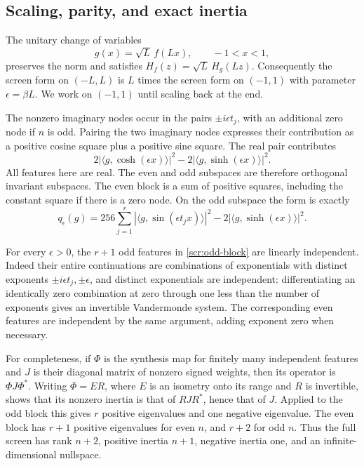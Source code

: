 \subsection{Scaling, parity, and exact inertia}

The unitary change of variables
\[
 g(x)=\sqrt L\,f(Lx),\qquad -1<x<1,
\]
preserves the norm and satisfies
\(H_f(z)=\sqrt L\,H_g(Lz)\). Consequently the screen form on
\((-L,L)\) is \(L\) times the screen form on \((-1,1)\) with
parameter \(\epsilon=\beta L\). We work on \((-1,1)\) until
scaling back at the end.

The nonzero imaginary nodes occur in the pairs
\(\pm i\epsilon t_j\), with an additional zero node if \(n\)
is odd. Pairing the two imaginary nodes expresses their contribution
as a positive cosine square plus a positive sine square. The real
pair contributes
\[
 2\left|\langle g,\cosh(\epsilon x)\rangle\right|^2
       -2\left|\langle g,\sinh(\epsilon x)\rangle\right|^2.
\]
All features here are real. The even and odd subspaces are therefore
orthogonal invariant subspaces. The even block is a sum of positive
squares, including the constant square if there is a zero node. On
the odd subspace the form is exactly
\begin{equation}\label{scr:odd-block}
 q_\epsilon(g)
   =256\sum_{j=1}^r
       |\langle g,\sin(\epsilon t_jx)\rangle|^2
       -2|\langle g,\sinh(\epsilon x)\rangle|^2.
\end{equation}

For every \(\epsilon>0\), the \(r+1\) odd features in
\eqref{scr:odd-block} are linearly independent. Indeed their entire
continuations are combinations of exponentials with distinct
exponents \(\pm i\epsilon t_j,\pm\epsilon\), and distinct
exponentials are independent: differentiating an identically zero
combination at zero through one less than the number of exponents
gives an invertible Vandermonde system. The corresponding even
features are independent by the same argument, adding exponent zero
when necessary.

For completeness, if \(\Phi\) is the synthesis map for finitely
many independent features and \(J\) is their diagonal matrix of
nonzero signed weights, then its operator is \(\Phi J\Phi^*\).
Writing \(\Phi=ER\), where \(E\) is an isometry onto its range
and \(R\) is invertible, shows that its nonzero inertia is that
of \(RJR^*\), hence that of \(J\). Applied to the odd block
this gives \(r\) positive eigenvalues and one negative eigenvalue.
The even block has \(r+1\) positive eigenvalues for even \(n\),
and \(r+2\) for odd \(n\). Thus the full screen has rank \(n+2\),
positive inertia \(n+1\), negative inertia one, and an
infinite-dimensional nullspace.

